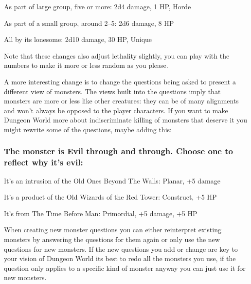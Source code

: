 \startitemize[1,packed]

\item As part of large group, five or more: 2d4 damage, 1 HP, Horde

 
\item As part of a small group, around 2–5: 2d6 damage, 8 HP

 
\item All by its lonesome: 2d10 damage, 30 HP, Unique


\stopitemize
 

Note that these changes also adjust lethality slightly, you can play with the numbers to make it more or less random as you please.

 

A more interesting change is to change the questions being asked to present a different view of monsters. The views built into the questions imply that monsters are more or less like other creatures: they can be of many alignments and won't always be opposed to the player characters. If you want to make Dungeon World more about indiscriminate killing of monsters that deserve it you might rewrite some of the questions, maybe adding this:

 
\subsubsection{The monster is Evil through and through. Choose one to reflect why it's evil:}       
 
\startitemize[1,packed]

\item It's an intrusion of the Old Ones Beyond The Walls: Planar, +5 damage

 
\item It's a product of the Old Wizards of the Red Tower: Construct, +5 HP

 
\item It's from The Time Before Man: Primordial, +5 damage, +5 HP


\stopitemize
 

When creating new monster questions you can either reinterpret existing monsters by answering the questions for them again or only use the new questions for new monsters. If the new questions you add or change are key to your vision of Dungeon World its best to redo all the monsters you use, if the question only applies to a specific kind of monster anyway you can just use it for new monsters.

 





 


